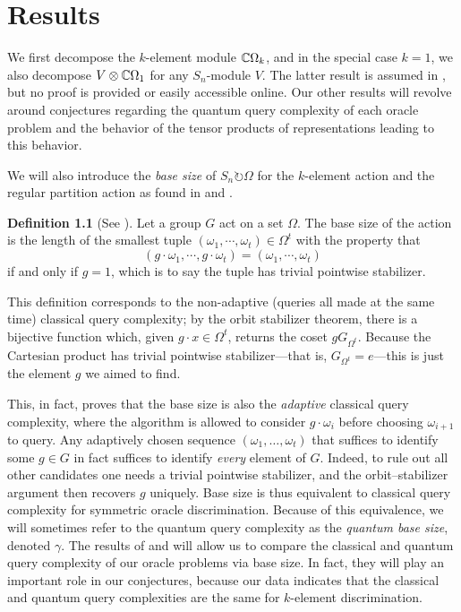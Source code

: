 \documentclass[12pt,twoside]{reedthesis}
\theoremstyle{plain}   %
\theoremstyle{definition}
\newtheorem{defn}{Definition}[section]
\theoremstyle{remark}
\numberwithin{equation}{section}
\def\acts{\circlearrowright} %
\begin{document}
  \chapter{Results}
  We first decompose the \(k\)-element module \(\mathbb{C}\Omega_k\), and in the special case \(k=1\), we also decompose \(V\otimes\mathbb{C}\Omega_1\) for any \(S_n\)-module \(V\).
  The latter result is assumed in \cite{copeland}, but no proof is provided or easily accessible online.
  Our other results will revolve around conjectures regarding the quantum query complexity of each oracle problem and the behavior of the tensor products of representations leading to this behavior.
  \par
  We will also introduce the \emph{base size} of $S_n \acts \Omega$ for the $k$-element action and the regular partition action as found in \cite{spiga23} and \cite{morris21}.
  \begin{defn}[{See \cite{copeland}}]
    Let a group $G$ act on a set $\Omega$.
    The base size of the action is the length of the smallest tuple $(\omega_1, \cdots, \omega_t) \in \Omega^t$ with the property that
    \[(g \cdot \omega_1, \cdots, g\cdot \omega_t) = (\omega_1, \cdots, \omega_t)\]
    if and only if $g=1$, which is to say the tuple has trivial pointwise stabilizer.
  \end{defn}
  This definition corresponds to the non-adaptive (queries all made at the same time) classical query complexity; by the orbit stabilizer theorem, there is a bijective function
  which, given $g \cdot x \in \Omega^t$, returns the coset $gG_{\Omega^t}$. Because the Cartesian product has trivial pointwise stabilizer---that is, $G_{\Omega^t} = e$---this is just the element $g$ we aimed to find. \par
  This, in fact, proves that the base size is also the \emph{adaptive} classical query complexity, where the algorithm is allowed to consider $g \cdot \omega_i$ before choosing $\omega_{i+1}$ to query.
  Any adaptively chosen sequence
\((\omega_1,\dots,\omega_t)\) that suffices to identify some \(g\in G\)
in fact suffices to identify \emph{every} element of \(G\).  Indeed,
to rule out all other candidates one needs a trivial pointwise stabilizer,
and the orbit–stabilizer argument then recovers \(g\) uniquely.
Base size is thus equivalent to classical query complexity for symmetric oracle discrimination.
Because of this equivalence, we will sometimes refer to the quantum query complexity as the \emph{quantum base size}, denoted $\gamma$.
The results of \cite{valle23} and \cite{morris21} will allow us to compare the classical and quantum query complexity of our oracle problems via base size.
In fact, they will play an important role in our conjectures, because our data indicates that the classical and quantum query complexities are the same for $k$-element discrimination.
\end{document}
